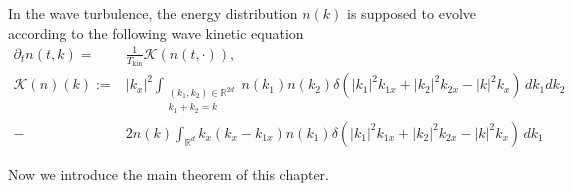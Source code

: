 In the wave turbulence, the energy distribution $n(k)$ is supposed to evolve according to the following wave kinetic equation
\[
\tag{WKE}\label{eq.WKE.threewave}
\begin{split}
\partial_t n(t, k) =&\frac{1}{T_{\text{kin}}}\mathcal K\left(n(t, \cdot)\right),
\\
\mathcal K(n)(k):=& |k_x|^2\int_{\substack{(k_1, k_2)\in \mathbb{R}^{2d}\\k_1+k_2=k}}n(k_1) n(k_2)\delta(|k_1|^2k_{1x}+|k_2|^2k_{2x}-|k|^2k_{x})\, dk_1 dk_2
\\
-& 2n(k)\int_{\mathbb{R}^d}k_x(k_x-k_{1x})n(k_1) \delta(|k_1|^2k_{1x}+|k_2|^2k_{2x}-|k|^2k_{x})\, dk_1
\end{split}
\]



Now we introduce the main theorem of this chapter.


